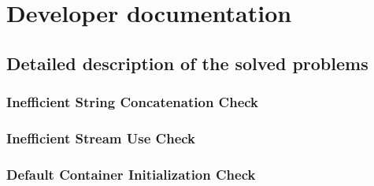 \section{Developer documentation}
\subsection{Detailed description of the solved problems}
\subsubsection{Inefficient String Concatenation Check}
\subsubsection{Inefficient Stream Use Check}
\subsubsection{Default Container Initialization Check}

